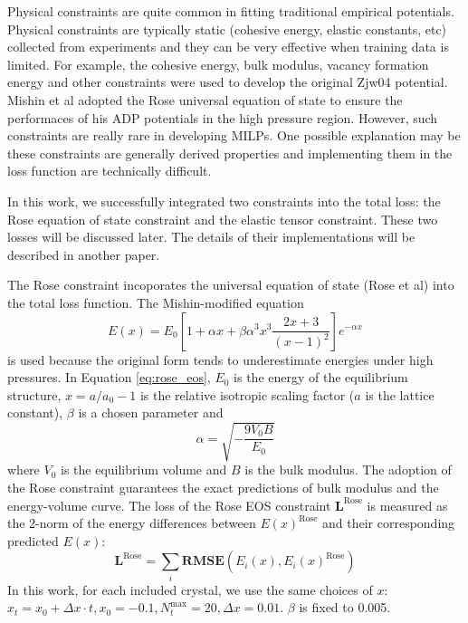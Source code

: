 \documentclass[prb,reprint]{revtex4-2}
\begin{document}
Physical constraints are quite common in fitting traditional empirical 
potentials. Physical constraints are typically static (cohesive energy, elastic 
constants, etc) collected from experiments and they can be very effective when 
training data is limited. For example, the cohesive energy, bulk modulus, 
vacancy formation energy and other constraints were used to develop the original 
Zjw04 potential. Mishin et al adopted the Rose universal equation of state to 
ensure the performaces of his ADP potentials in the high pressure region. 
However, such constraints are really rare in developing MILPs. One possible 
explanation may be these constraints are generally derived properties and 
implementing them in the loss function are technically difficult.

In this work, we successfully integrated two constraints into the total loss:
the Rose equation of state constraint and the elastic tensor constraint. These 
two losses will be discussed later. The details of their implementations will be 
described in another paper.

The Rose constraint incoporates the universal equation of state (Rose et al) 
into the total loss function. The Mishin-modified equation 
\begin{equation}
\label{eq:rose_eos}
E(x) = E_{0}\left[
    1 + \alpha x + \beta \alpha^3 x^3 \frac{2x + 3}{(x - 1)^2} \right]
    e^{-\alpha x}
\end{equation}
is used because the original form tends to underestimate energies under high 
pressures. In Equation \ref{eq:rose_eos}, $E_{0}$ is the energy of the 
equilibrium structure, $x = a / a_{0} - 1$ is the relative isotropic scaling 
factor ($a$ is the lattice constant), $\beta$ is a chosen parameter and 
\begin{equation}
\label{eq:rose_alpha}
\alpha = \sqrt{-\frac{9 V_{0} B }{E_{0}}}
\end{equation}
where $V_0$ is the equilibrium volume and $B$ is the bulk modulus. The adoption
of the Rose constraint guarantees the exact predictions of bulk modulus and 
the energy-volume curve. The loss of the Rose EOS constraint 
$\mathbf{L}^{\mathrm{Rose}}$  is measured as the 2-norm of the energy 
differences between $E(x)^{\mathrm{Rose}}$ and their corresponding predicted 
$E(x)$: 
\begin{equation}
\label{eq:rose_loss}
\mathbf{L}^{\mathrm{Rose}} =
\sum_{i}{\mathbf{RMSE}(E_{i}(x), E_{i}(x)^{\mathrm{Rose}})}
\end{equation}
In this work, for each included crystal, we use the same choices of $x$: 
$x_{t} = x_{0} + \Delta x \cdot t, x_{0} = -0.1, N_{t}^{\mathrm{max}} = 20, 
\Delta x=0.01$. $\beta$ is fixed to 0.005.
\end{document}
